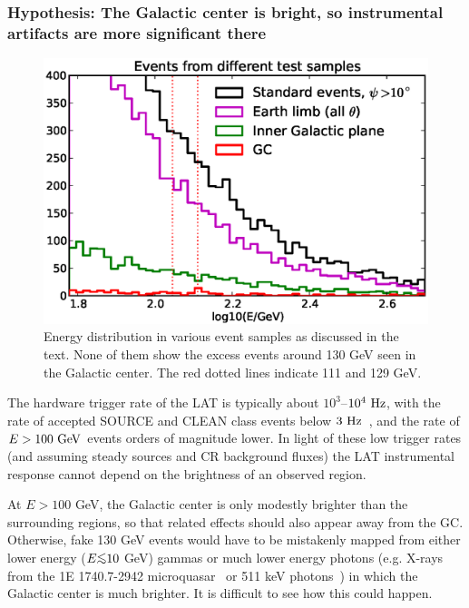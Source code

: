 \documentclass[aps,twocolumn,prd,superscriptaddress,showpacs,nofootinbib,fixfloat]{revtex4}
\newcommand{\Hz}{{\rm ~Hz}}
\newcommand{\GeV}{{\rm ~GeV}}
\def\la{\vcenter{\hbox{$<$}\offinterlineskip\hbox{$\sim$}}}
\begin{document}
\subsubsection{Hypothesis: The Galactic center is bright, so
instrumental artifacts are more significant there}

\begin{figure}
  \centering
  \includegraphics[width=1.0\linewidth]{plots/target_spectra.eps}
  \caption{Energy distribution in various event samples 
      as
  discussed in the text. None of them show the excess events
  around 130 GeV seen in the Galactic center. The red dotted
  lines indicate 111 and 129 GeV.}
  \label{fig:target_spectra}
\end{figure}

The hardware trigger rate of the LAT is typically
about $10^3$--$10^4\Hz$, with the rate of
accepted SOURCE and CLEAN class events below
$3\Hz$~\citep{collaboration:2012kca}, and the rate of $E>100\GeV$ events
orders of magnitude lower. In light of these low trigger rates
(and assuming steady sources and CR background fluxes) the
LAT instrumental response cannot
depend on the brightness of an observed region.

At $E > 100$ GeV, the Galactic center is only modestly brighter
than the surrounding regions, so that related effects should also appear away
from the GC. Otherwise, fake 130 GeV events would have to be mistakenly
mapped from either lower energy ($E \la 10$ GeV) gammas or much lower energy
photons (e.g.  X-rays from the 1E 1740.7-2942 microquasar~\cite{Gallo:2002} or
511 keV photons~\cite{Prantzos:2011}) in which the Galactic center is much
brighter.  It is difficult to see how this could happen.
\end{document}
